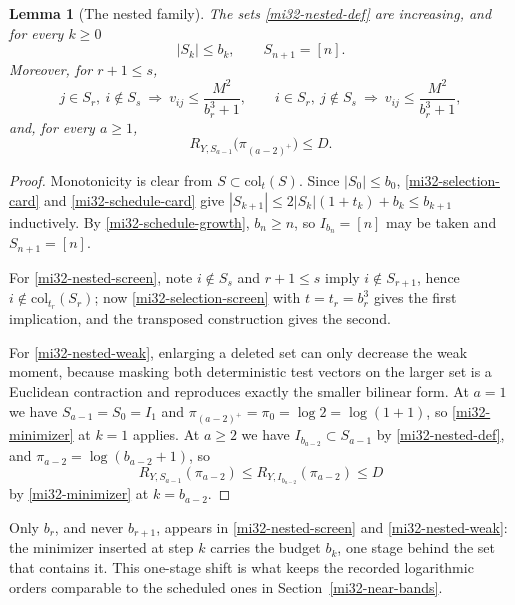 \documentclass[11pt]{article}
\newtheorem{lemma}[theorem]{Lemma}
\theoremstyle{definition}
\theoremstyle{remark}
\begin{document}
\begin{lemma}[The nested family]
\label{mi32-nested-lemma}
The sets \eqref{mi32-nested-def} are increasing, and for every $k\ge0$
\begin{equation}\label{mi32-nested-card}
 |S_k|\le b_k,\qquad S_{n+1}=[n].
\end{equation}
Moreover, for $r+1\le s$,
\begin{equation}\label{mi32-nested-screen}
 j\in S_r,\ i\notin S_s\ \Longrightarrow\
 v_{ij}\le\frac{M^2}{b_r^3+1},
 \qquad
 i\in S_r,\ j\notin S_s\ \Longrightarrow\
 v_{ij}\le\frac{M^2}{b_r^3+1},
\end{equation}
and, for every $a\ge1$,
\begin{equation}\label{mi32-nested-weak}
 R_{Y,S_{a-1}}\bigl(\pi_{(a-2)^+}\bigr)\le D .
\end{equation}
\end{lemma}
\begin{proof}
Monotonicity is clear from $S\subset\mathrm{col}_t(S)$. Since
$|S_0|\le b_0$, \eqref{mi32-selection-card} and
\eqref{mi32-schedule-card} give
$|S_{k+1}|\le2|S_k|(1+t_k)+b_k\le b_{k+1}$ inductively. By
\eqref{mi32-schedule-growth}, $b_n\ge n$, so $I_{b_n}=[n]$ may be
taken and $S_{n+1}=[n]$.

For \eqref{mi32-nested-screen}, note $i\notin S_s$ and $r+1\le s$ imply
$i\notin S_{r+1}$, hence $i\notin\mathrm{col}_{t_r}(S_r)$; now
\eqref{mi32-selection-screen} with $t=t_r=b_r^3$ gives the first
implication, and the transposed construction gives the second.

For \eqref{mi32-nested-weak}, enlarging a deleted set can only decrease
the weak moment, because masking both deterministic test vectors on the
larger set is a Euclidean contraction and reproduces exactly the
smaller bilinear form. At $a=1$ we have $S_{a-1}=S_0=I_1$ and
$\pi_{(a-2)^+}=\pi_0=\log2=\log(1+1)$, so \eqref{mi32-minimizer} at
$k=1$ applies. At $a\ge2$ we have $I_{b_{a-2}}\subset S_{a-1}$ by
\eqref{mi32-nested-def}, and $\pi_{a-2}=\log(b_{a-2}+1)$, so
\[
 R_{Y,S_{a-1}}(\pi_{a-2})\le R_{Y,I_{b_{a-2}}}(\pi_{a-2})\le D
\]
by \eqref{mi32-minimizer} at $k=b_{a-2}$.
\end{proof}

Only $b_r$, and never $b_{r+1}$, appears in \eqref{mi32-nested-screen}
and \eqref{mi32-nested-weak}: the minimizer inserted at step $k$ carries
the budget $b_k$, one stage behind the set that contains it. This
one-stage shift is what keeps the recorded logarithmic orders
comparable to the scheduled ones in Section~\ref{mi32-near-bands}.
\end{document}
